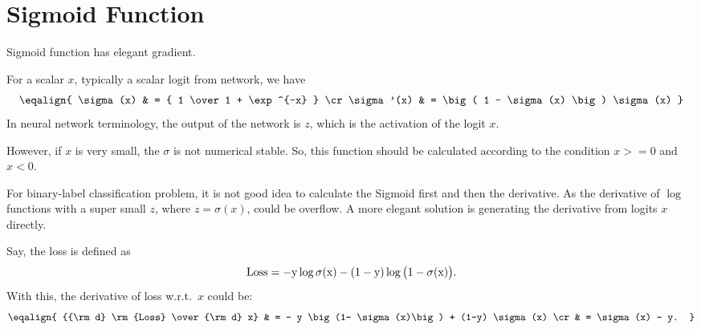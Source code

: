 

\section{Sigmoid Function}

Sigmoid function has elegant gradient.

For a scalar $x$, typically a scalar logit from network, we have
%
$$
    \eqalign{
        \sigma(x)  & = { 1 \over 1 + \exp^{-x} } \cr
        \sigma'(x) & = \big( 1 - \sigma(x) \big) \sigma(x)
    }
$$
In neural network terminology, the output of the network is $z$, which is the
activation of the logit $x$.

However, if $x$ is very small, the $\sigma$ is not numerical stable. So, this
function should be calculated according to the condition $x>=0$ and $x<0$.

For binary-label classification problem, it is not good idea to calculate the
Sigmoid first and then the derivative. As the derivative of $\log$ functions
with a super small $z$, where $z=\sigma(x)$,  could be overflow. A more elegant
solution is generating the derivative from logits $x$ directly.

Say, the loss is defined as
%
$$
    \rm{Loss} = - y \log \sigma(x) - (1-y) \log \big(1-\sigma(x)\big).
$$
With this, the derivative of loss w.r.t.~$x$ could be:
%
$$
    \eqalign{
        {{\rm d} \rm{Loss} \over {\rm d} x}
            & = - y \big(1- \sigma(x)\big) + (1-y) \sigma(x) \cr
            & = \sigma(x) - y.
    }
$$

\vfill
\bye
